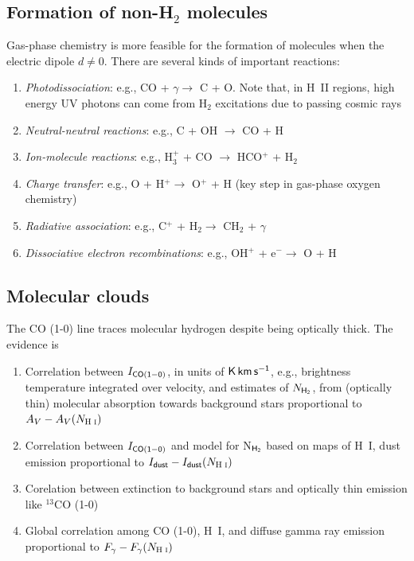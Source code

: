 \documentclass{tufte-handout}
\renewcommand{\rm}{\sf}
\newcommand{\HI}{\textnormal{H{\smaller~\textsc{I}}}}
\newcommand{\HII}{\textnormal{H{\smaller~\textsc{II}}}}
\newcommand{\Htwo}{\textnormal{H$_2$}}
\begin{document}
\subsection{Formation of non-\Htwo{} molecules}
Gas-phase chemistry is more feasible for the formation of molecules when the electric dipole $d \neq 0$.
There are several kinds of important reactions:
\begin{enumerate}
\item \textit{Photodissociation}: e.g., CO + $\gamma \rightarrow$ C + O. Note that, in \HII{} regions, high energy UV photons can come from \Htwo{} excitations due to passing cosmic rays
\item \textit{Neutral-neutral reactions}: e.g., C + OH $\rightarrow$ CO + H
\item \textit{Ion-molecule reactions}: e.g., H$_3^+$ + CO $\rightarrow$ HCO$^+$ + \Htwo{}
\item \textit{Charge transfer}: e.g., O + H$^+ \rightarrow$ O$^+$ + H (key step in gas-phase oxygen chemistry)
\item \textit{Radiative association}: e.g., C$^+$ + \Htwo $\rightarrow$ CH$_2$ + $\gamma$
\item \textit{Dissociative electron recombinations}: e.g., OH$^+$ + e$^- \rightarrow$ O + H 
\end{enumerate}


\subsection{Molecular clouds}
The CO (1-0) line traces molecular hydrogen despite being optically thick. The evidence is
\begin{enumerate}
\item Correlation between $I_{\rm CO(1-0)}$, in units of ${\rm K\, km\, s^{-1}}$, e.g., brightness temperature integrated over velocity, and estimates of $N_{\rm H_{2}}$, from (optically thin) molecular absorption towards background stars proportional to $A_V - A_V(N_{\HI{}})$
\item Correlation between $I_{\rm CO(1-0)}$ and model for N$_{\rm H_2}$ based on maps of \HI{}, dust emission proportional to $I_{\rm dust} - I_{\rm dust}(N_{\HI{}})$
\item Corelation between extinction to background stars and optically thin emission like $^{13}$CO (1-0)
\item Global correlation among CO (1-0), \HI{}, and diffuse gamma ray emission proportional to $F_\gamma - F_\gamma(N_{\HI{}})$
\end{enumerate}
\end{document}
